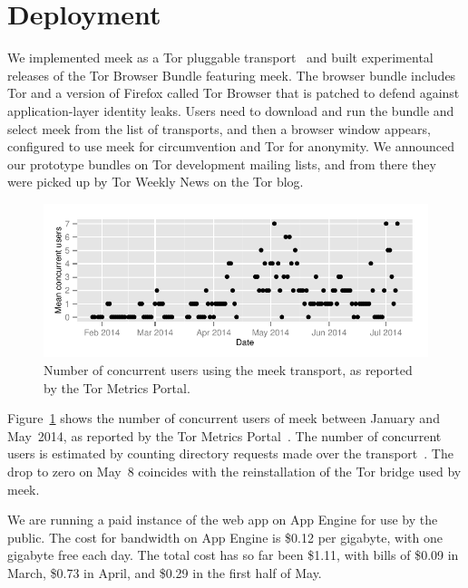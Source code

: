 \documentclass[conference]{IEEEtran}
\begin{document}

\section{Deployment}
\label{sec:deployment}

We implemented meek as a Tor pluggable transport~\cite{pt}
and built experimental releases of the Tor Browser Bundle featuring meek.
The browser bundle includes Tor and a version of Firefox
called Tor Browser that is patched to defend against application-layer identity leaks.
Users need to download and run the bundle and select meek from the list of transports,
and then a browser window appears,
configured to use meek for circumvention and Tor for anonymity.
We announced our prototype bundles on Tor development mailing lists,
and from there they were picked up by Tor Weekly News on the Tor blog.

\begin{figure}
\includegraphics[width=\linewidth]{clients-meek}
\caption{Number of concurrent users using the meek transport,
as reported by the Tor Metrics Portal.}
\label{fig:clients}
\end{figure}

Figure~\ref{fig:clients} shows the number of concurrent users of meek between January and May~2014,
as reported by the Tor Metrics Portal~\cite{metrics-meek}.
The number of concurrent users is estimated by counting directory requests made over the transport~\cite{counting-daily-bridge-users}.
The drop to zero on May~8 coincides with the reinstallation of the Tor bridge used by meek.

We are running a paid instance of the web app on App Engine for use by the public.
The cost for bandwidth on App Engine is \$0.12 per gigabyte,
with one gigabyte free each day.
The total cost has so far been \$1.11, with bills of
\$0.09 in March,
\$0.73 in April,
and \$0.29 in the first half of May.
\end{document}
